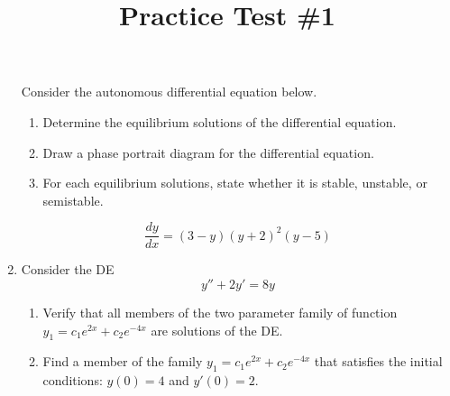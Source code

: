 \documentclass[12pt]{report}
\title{Practice Test \#1}
\begin{document}
\begin{enumerate}[label=\arabic*.]
     Consider the autonomous differential equation below.
	\begin{enumerate}[label=(\alph*)]
	    \item Determine the equilibrium solutions of the differential equation.
		\item Draw a phase portrait diagram for the differential equation.
		\item For each equilibrium solutions, state whether it is stable, unstable, or semistable.
	\end{enumerate}
	\[ \frac{dy}{dx} = (3-y)(y+2)^{2}(y-5) \]
	\item Consider the DE \[ y'' + 2y' = 8y \]
	\begin{enumerate}[label=(\roman*)]
	    \item Verify that all members of the two parameter family of function $y_{1}=c_{1}e^{2x} + c_{2}e^{-4x}$ are solutions of the DE.
		\item Find a member of the family $y_{1}=c_{1}e^{2x} + c_{2}e^{-4x}$ that satisfies the initial conditions: $y(0)=4$ and $y'(0) = 2$.
\end{enumerate}
\end{enumerate}
\end{document}
